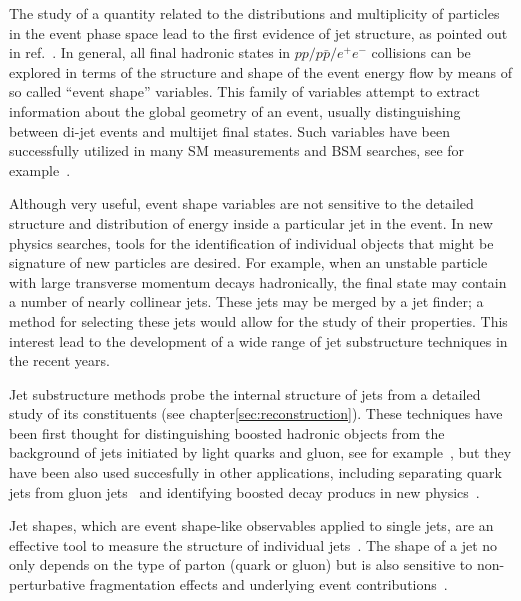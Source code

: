 The study of a quantity related to the distributions and multiplicity of particles in the event phase space lead to the first evidence of jet structure, as pointed out in ref.~\cite{PhysRevLett.35.1609}. In general, all final hadronic states in $pp/p\bar{p}/e^+e^-$ collisions can be explored in terms of the structure and shape of the event energy flow by means of so called ``event shape'' variables. This family of variables attempt to extract information about the global geometry of an event, usually distinguishing between di-jet events and multijet final states. Such variables have been successfully utilized in many SM measurements and BSM searches, see for example~\cite{Abbiendi:2007aa}\cite{Aad:2012np}. 

Although very useful, event shape variables are not sensitive to the detailed structure and distribution of energy inside a particular jet in the event. In new physics searches, tools for the identification of individual objects that might be signature of new particles are desired. For example, when an unstable particle with large transverse momentum decays hadronically, the final state may contain a number of nearly collinear jets. These jets may be merged by a jet finder; %
a method for selecting these jets would allow for the study of their properties.
  This interest lead to the development of a wide range of jet substructure techniques in the recent years.

  Jet substructure methods probe the internal structure of jets from a detailed study of its constituents (see chapter\ref{sec:reconstruction}). These techniques have been first thought for distinguishing boosted hadronic objects from the background of jets initiated by light quarks and gluon, see for example~\cite{ATLASBoostedHbb},
but they have been also used succesfully in other applications, including separating quark jets from gluon jets~\cite{PhysRevLett.107.172001} and identifying boosted decay producs in new physics~\cite{PhysRevD.82.095012}.

Jet shapes, which are event shape-like observables applied to single jets, are an effective tool to measure the structure of individual jets~\cite{springerlink:10.1007/JHEP11(2010)101}.%
 The shape of a jet no only depends on the type of parton (quark or gluon) but is also sensitive to non-perturbative fragmentation effects and underlying event contributions~\cite{ATLASJetShapes}.


